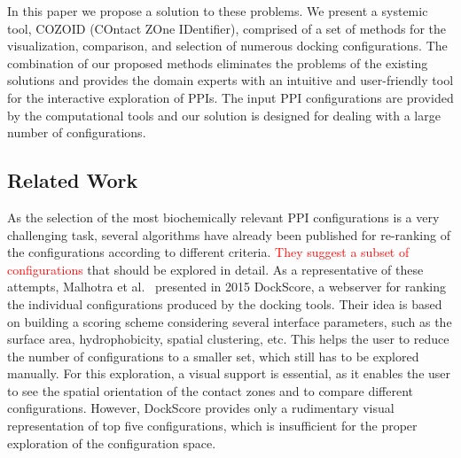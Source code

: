\documentclass{bmcart}
\begin{document}
In this paper we propose a solution to these problems.
We present a systemic tool, COZOID (COntact ZOne IDentifier), comprised of a set of methods for the visualization, comparison, and selection of numerous docking configurations.
The combination of our proposed methods eliminates the problems of the existing solutions and provides the domain experts with an intuitive and user-friendly tool for the interactive exploration of PPIs.
The input PPI configurations are provided by the computational tools and our solution is designed for dealing with a large number of configurations. 

\subsection*{Related Work}
As the selection of the most biochemically relevant PPI configurations is a very challenging task, several algorithms have already been published for re-ranking of the configurations according to different criteria.
\textcolor{red}{They suggest a subset of configurations} that should be explored in detail.
As a representative of these attempts, Malhotra et al.~\cite{Malhotra2015} presented in 2015 DockScore, a webserver for ranking the individual configurations produced by the docking tools. 
Their idea is based on building a scoring scheme considering several interface parameters, such as the surface area, hydrophobicity, spatial clustering, etc.
This helps the user to reduce the number of configurations to a smaller set, which still has to be explored manually.
For this exploration, a visual support is essential, as it enables the user to see the spatial orientation of the contact zones and to compare different configurations.
However, DockScore provides only a rudimentary visual representation of top five configurations, which is insufficient for the proper exploration of the configuration space.
 
\end{document}
